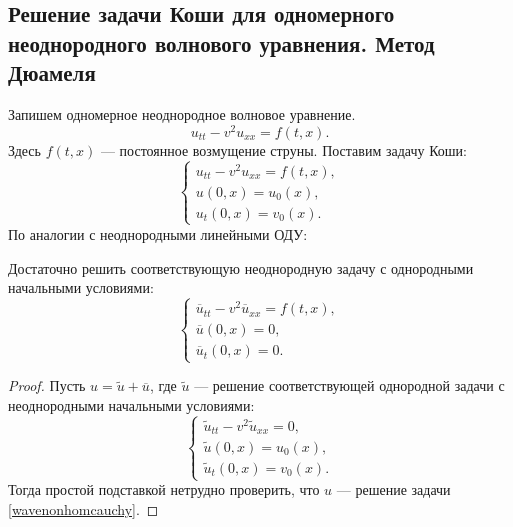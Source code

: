 
\subsection{Решение задачи Коши для одномерного неоднородного волнового уравнения. Метод Дюамеля}
Запишем одномерное неоднородное волновое уравнение.
\begin{equation*}
	u_{tt} - v^2 u_{xx} = f(t,x).
\end{equation*}
Здесь $f(t,x)$ --- постоянное возмущение струны. Поставим задачу Коши:
\begin{equation}
	\begin{cases}
		u_{tt} - v^2 u_{xx} = f(t,x), \\
		u(0,x) = u_0(x), \\
		u_t(0,x) = v_0(x).
	\end{cases}
\label{wavenonhomcauchy}
\end{equation}
По аналогии с неоднородными линейными ОДУ:
\begin{note} Достаточно решить соответствующую неоднородную задачу с однородными начальными условиями:
\begin{equation}
	\begin{cases}
		\overline{u}_{tt} - v^2 \overline{u}_{xx} = f(t,x), \\
		\overline{u}(0,x) = 0, \\
		\overline{u}_t(0,x) = 0.
	\end{cases}
\label{wavehomcauchy}
\end{equation}
\end{note}
\begin{proof}
Пусть $u = \widetilde{u} + \overline{u}$, где $\widetilde{u}$ --- решение соответствующей однородной задачи с неоднородными начальными условиями:
\begin{equation*}
	\begin{cases}
		\widetilde{u}_{tt} - v^2 \widetilde{u}_{xx} = 0, \\
		\widetilde{u}(0,x) = u_0(x), \\
		\widetilde{u}_t(0,x) = v_0(x).
	\end{cases}
\end{equation*}
Тогда простой подставкой нетрудно проверить, что $u$ --- решение задачи \eqref{wavenonhomcauchy}.

\end{proof}
